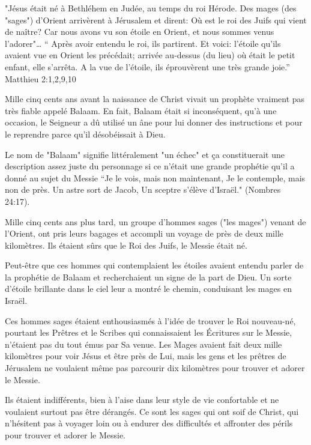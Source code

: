 

"Jésus était né à Bethléhem en Judée, au temps du roi Hérode. Des mages (des "sages") d’Orient arrivèrent à Jérusalem et dirent: Où est le roi des Juifs qui vient de naître? Car nous avons vu son étoile en Orient, et nous sommes venus l’adorer"… “ Après avoir entendu le roi, ils partirent. Et voici: l’étoile qu’ils avaient vue en Orient les précédait; arrivée au-dessus (du lieu) où était le petit enfant, elle s’arrêta. A la vue de l’étoile, ils éprouvèrent une très grande joie.”    ~ Matthieu 2:1,2,9,10

Mille cinq cents ans avant la naissance de Christ vivait un prophète vraiment pas très fiable appelé Balaam. En fait, Balaam était si inconséquent, qu'à une occasion, le Seigneur a dû utilisé un âne pour lui donner des instructions et pour le reprendre parce qu'il désobéissait à Dieu.

Le nom de "Balaam" signifie littéralement "un échec" et ça constituerait une description assez juste du personnage si ce n'était une grande prophétie qu'il a donné au sujet du Messie “Je le vois, mais non maintenant, Je le contemple, mais non de près. Un astre sort de Jacob, Un sceptre s’élève d’Israël." (Nombres 24:17).

Mille cinq cents ans plus tard, un groupe d'hommes sages ("les mages") venant de l'Orient, ont pris leurs bagages et accompli un voyage de près de deux mille kilomètres. Ils étaient sûrs que le Roi des Juifs, le Messie était né.

Peut-être que ces hommes qui contemplaient les étoiles avaient entendu parler de la prophétie de Balaam et recherchaient un signe de la part de Dieu. Un sorte d'étoile brillante dans le ciel leur a montré le chemin, conduisant les mages en Israël.

Ces hommes sages étaient enthousiasmés à l'idée de trouver le Roi nouveau-né, pourtant les Prêtres et le Scribes qui connaissaient les Écritures sur le Messie, n'étaient pas du tout émus par Sa venue. Les Mages avaient fait deux mille kilomètres pour voir Jésus et être près de Lui, mais les gens et les prêtres de Jérusalem ne voulaient même pas parcourir dix kilomètres pour trouver et adorer le Messie.

Ils étaient indifférents, bien à l'aise dans leur style de vie confortable et ne voulaient surtout pas être dérangés. Ce sont les sages qui ont soif de Christ, qui n'hésitent pas à voyager loin ou à endurer des difficultés et affronter des périls pour trouver et adorer le Messie.

